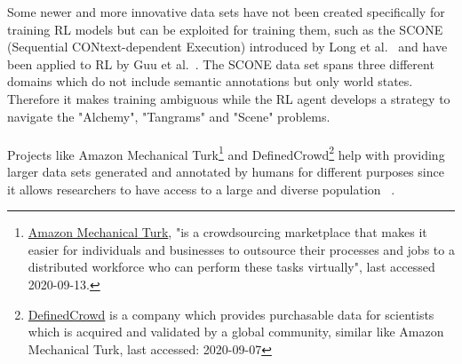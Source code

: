 \documentclass[11pt]{article}
\begin{document}
Some newer and more innovative data sets have not been created specifically for training RL models but can be exploited for training them, such as the SCONE (Sequential CONtext-dependent Execution) introduced by Long et al.~ and have been applied to RL by Guu et al.~. The SCONE data set spans three different domains which do not include semantic annotations but only world states. Therefore it makes training ambiguous while the RL agent develops a strategy to navigate the "Alchemy", "Tangrams" and "Scene" problems.\\\\
Projects like Amazon Mechanical Turk\footnote{\hyperlink{https://www.mturk.com/}{Amazon Mechanical Turk}, "is a crowdsourcing marketplace that makes it easier for individuals and businesses to outsource their processes and jobs to a distributed workforce who can perform these tasks virtually", last accessed 2020-09-13.} and DefinedCrowd\footnote{\hyperlink{https://www.definedcrowd.com/}{DefinedCrowd} is a company which provides purchasable data for scientists which is acquired and validated by a global community, similar like Amazon Mechanical Turk, last accessed: 2020-09-07} help with providing larger data sets generated and annotated by humans for different purposes since it allows researchers to have access to a large and diverse population ~\cite{AMTurk-2012}. 
\end{document}
